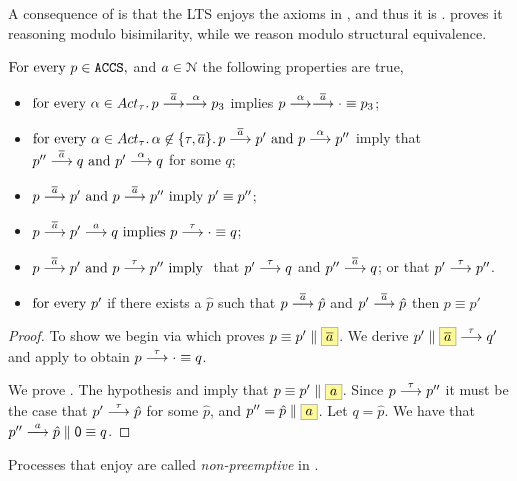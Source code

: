 A consequence of  is that the LTS
\lts{\modulo{\ACCS}{\equiv}}{\modulo{\st{}}{\equiv}}{\Acttau}
enjoys the axioms in , and thus it is \obaFB.
\cite[Theorem 4.3]{DBLP:conf/concur/Selinger97} proves it reasoning modulo
bisimilarity, while we reason modulo structural equivalence.
\begin{lemma}%
\label{lem:ACCSmodulos-equiv-is-out-buffered-with-feedback}
$\text{For every } p \in \texttt{ACCS},$ and $a \in \mathcal{N}$ the following properties are true,
\begin{itemize}
\item%
  $\forevery \alpha \in \Acttau \wehavethat p \st{\co{\aa}}\st{\alpha} p_3$ implies $ p \mathrel{\overset{ \alpha }\longrightarrow}\mathrel{\overset{ \overline{a}}\longrightarrow} \cdot \equiv p_3$;
\item%
  $\forevery \alpha \in \Acttau \suchthat
  \alpha \not\in\set{ \tau, \co{\aa}} \wehavethat p \st{\co{\aa}} p'
  \text{ and } p \st{\alpha} p''$ imply that $p'' \mathrel{\overset{\overline{a}}\longrightarrow} q \text{ and }p' \mathrel{\overset{\alpha}\longrightarrow} q$ for some $q$;
\item%
  $ p \mathrel{\overset{\overline{a}}\longrightarrow} p' \text{ and } p \mathrel{\overset{\overline{a}}\longrightarrow} p'' \text{ imply } p' \equiv p''$;
\item%
  $p \mathrel{\overset{\overline{a}}\longrightarrow} p' \mathrel{\overset{a}\longrightarrow} q \text{ implies } p \mathrel{\overset{\tau}\longrightarrow} \cdot \equiv  q$;
\item%
  $ p \mathrel{\overset{\overline{a}}\longrightarrow} p' \text{ and } p \mathrel{\overset{\tau}\longrightarrow} p'' \text{ imply }$ that $p' \mathrel{\overset{\tau}\longrightarrow} q$ and $p'' \mathrel{\overset{\overline{a}}\longrightarrow} q$; or that $p' \mathrel{\overset{\tau}\longrightarrow} p''$.
  \item  $\text{for every } p'$ if there exists a $\hat{p}$ such that
   $p \mathrel{\overset{\overline{a}}\longrightarrow} \hat{p}$ and $p' \mathrel{\overset{\overline{a}}\longrightarrow} \hat{p}$
   then $p \equiv p'$
\end{itemize}
\end{lemma}
\begin{proof}
  To show  we begin via 
  which proves $p \equiv p' \Par \mailbox{\co{\aa}}$.
  We derive $p' \Par \mailbox{\co{\aa}} \st{ \tau } q'$
  and apply  to obtain
  $ p \mathrel{\overset{\tau}\longrightarrow} \cdot \equiv q $.

  We prove .
  The hypothesis and  imply that $ p \equiv p' \Par \mailbox{\aa}$.
  Since $ p \mathrel{\overset{ \tau }\longrightarrow} p'' $ it must be the case that
  $ p' \mathrel{\overset{ \tau }\longrightarrow} \hat{p}$ for some $ \hat{p}$,
  and $p'' =  \hat{p} \Par \mailbox{\aa}$.
  Let $q = \hat{p}$. We have that $ p'' \mathrel{\overset{ a }\longrightarrow} \hat{p} \mathrel{\parallel} \mathop{\textsf{0}} \equiv q$.
\end{proof}
\noindent
Processes that enjoy  are called {\em
non-preemptive} in \cite[Definition
10]{DBLP:conf/lics/CleavelandZ91}.


